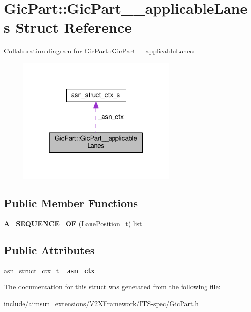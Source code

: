 \hypertarget{structGicPart_1_1GicPart____applicableLanes}{}\section{Gic\+Part\+:\+:Gic\+Part\+\_\+\+\_\+applicable\+Lanes Struct Reference}
\label{structGicPart_1_1GicPart____applicableLanes}


Collaboration diagram for Gic\+Part\+:\+:Gic\+Part\+\_\+\+\_\+applicable\+Lanes\+:\nopagebreak
\begin{figure}[H]
\begin{center}
\leavevmode
\includegraphics[width=223pt]{structGicPart_1_1GicPart____applicableLanes__coll__graph}
\end{center}
\end{figure}
\subsection*{Public Member Functions}
\begin{DoxyCompactItemize}
\item 
{\bfseries A\+\_\+\+S\+E\+Q\+U\+E\+N\+C\+E\+\_\+\+OF} (Lane\+Position\+\_\+t) list\hypertarget{structGicPart_1_1GicPart____applicableLanes_ae93adfb7f52741827eea7c818050da00}{}\label{structGicPart_1_1GicPart____applicableLanes_ae93adfb7f52741827eea7c818050da00}

\end{DoxyCompactItemize}
\subsection*{Public Attributes}
\begin{DoxyCompactItemize}
\item 
\hyperlink{structasn__struct__ctx__s}{asn\+\_\+struct\+\_\+ctx\+\_\+t} {\bfseries \+\_\+asn\+\_\+ctx}\hypertarget{structGicPart_1_1GicPart____applicableLanes_aa72f0ad462fe951d2e4e8d71e88cef03}{}\label{structGicPart_1_1GicPart____applicableLanes_aa72f0ad462fe951d2e4e8d71e88cef03}

\end{DoxyCompactItemize}


The documentation for this struct was generated from the following file\+:\begin{DoxyCompactItemize}
\item 
include/aimsun\+\_\+extensions/\+V2\+X\+Framework/\+I\+T\+S-\/spec/Gic\+Part.\+h\end{DoxyCompactItemize}
